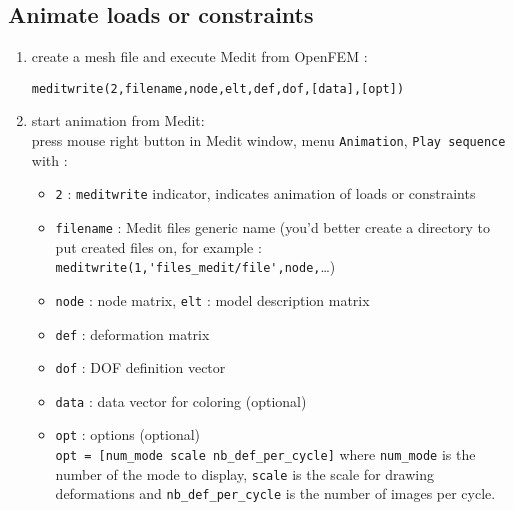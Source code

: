 \documentclass[a4paper]{article}
\begin{document}
\subsection{Animate loads or constraints} 
\begin{enumerate}
\item create a mesh file and execute Medit from OpenFEM :
\begin{center} \verb+meditwrite(2,filename,node,elt,def,dof,[data],[opt])+ \end{center}
\item start animation from Medit:\\
press mouse right button in Medit window, menu \verb+Animation+, \verb+Play sequence+\\
$ $\\
with : 
\begin{itemize}
\item \verb+2+ : \verb+meditwrite+ indicator, indicates animation of loads or constraints
\item \verb+filename+ : Medit files generic name (you'd better create a directory to put created files on, for example :\\ \verb+meditwrite(1,'files_medit/file',node,+\ldots)
\item  \verb+node+ : node matrix, \verb+elt+ : model description matrix
\item \verb+def+ : deformation matrix
\item \verb+dof+ : DOF definition vector
\item \verb+data+ : data vector for coloring (optional)
\item \verb+opt+ : options (optional)\\\verb+opt = [num_mode scale nb_def_per_cycle]+ where \verb+num_mode+ is the number of the mode to display, \verb+scale+ is the scale for drawing deformations and \verb+nb_def_per_cycle+ is the number of images per cycle.
\end{itemize}
\end{enumerate}
\end{document}
